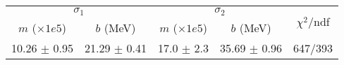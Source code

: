 \begin{tabular}{cc|cc||c}
\multicolumn{2}{c|}{$\sigma_1$} & \multicolumn{2}{|c}{$\sigma_2$}  & \multirow{2}{*}{$\chi^2/$ndf}\\
$m$ ($\times1e5$) & $b$ (MeV) & $m$ ($\times1e5$) & $b$ (MeV)  & \\
\hline
10.26 $\pm$ 0.95 & 21.29 $\pm$ 0.41 & 17.0 $\pm$ 2.3 & 35.69 $\pm$ 0.96 & 647/393\\
\end{tabular}
